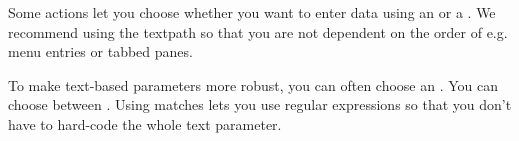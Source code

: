 Some actions let you choose whether you want to enter data using an  or a . We recommend using the textpath so that you are not dependent on the order of e.g. menu entries or tabbed panes. 

To make text-based parameters more robust, you can often choose an . You can choose between . Using matches lets you use regular expressions so that you don't have to hard-code the whole text parameter. 




